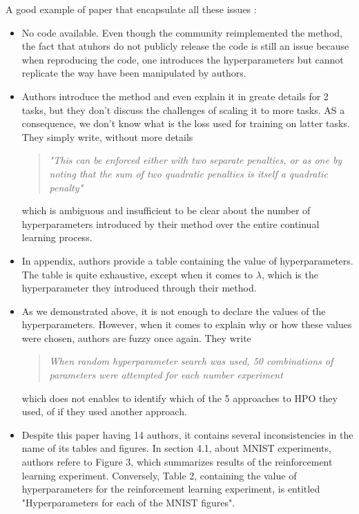 \documentclass[twocolumn]{article}
\begin{document}
A good example of paper that encapsulate all these issues :
\begin{itemize}
    \item No code available. Even though the community reimplemented the method, the fact that atuhors do not publicly release the code is still an issue because when reproducing the code, one introduces the hyperparameters but cannot replicate the way have been manipulated by authors.
    \item Authors introduce the method and even explain it in greate details \cite{EWC_nuts_and_bolts} for 2 tasks, but they don't discuss the challenges of scaling it to more tasks. AS a consequence, we don't know what is the loss used for training on latter tasks. They simply write, without more details
    \begin{quote}
        \itshape
        "This can be enforced either with two separate penalties, or as one by noting that the sum of two quadratic penalties is itself a quadratic penalty"
    \end{quote}
    which is ambiguous and insufficient to be clear about the number of hyperparameters introduced by their method over the entire continual learning process.
    \item In appendix, authors provide a table containing the value of hyperparameters. The table is quite exhaustive, except when it comes to $\lambda$, which is the hyperparameter they introduced through their method.
    \item As we demonstrated above, it is not enough to declare the values of the hyperparameters. However, when it comes to explain why or how these values were chosen, authors are fuzzy once again. They write
    \begin{quote}
        \itshape
        When random hyperparameter search was used, 50 combinations of parameters were attempted for each number experiment
    \end{quote}
    which does not enables to identify which of the 5 approaches to HPO they used, of if they used another approach.
    \item Despite this paper having 14 authors, it contains several inconsistencies in the name of its tables and figures. In section 4.1, about MNIST experiments, authors refere to Figure 3, which summarizes results of the reinforcement learning experiment. Conversely, Table 2, containing the value of hyperparameters for the reinforcement learning experiment, is entitled "Hyperparameters for each of the MNIST figures".
\end{itemize}
\end{document}
